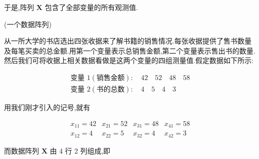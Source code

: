 于是,阵列 $\bm{X}$ 包含了全部变量的所有观测值.

 (一个数据阵列)

从一所大学的书店选出四张收据来了解书籍的销售情况.每张收据提供了售书数量及每笔买卖的总金额.用第一个变量表示总销售金额,第二个变量表示售出书的数量.然后我们可将收据上相关数据看做是这两个变量的四组测量值.假定数据如下所示:

\[
\begin{array}{l}
\text{变量 }1(\text{销售金额}):\quad 42 \quad 52 \quad 48 \quad 58 \\[2pt]
\text{变量 }2(\text{书的总数}):\quad 4 \quad 5 \quad 4 \quad 3
\end{array}
\]

用我们刚才引入的记号,就有

\[
\begin{array}{llll}
x_{11} = 42 & x_{21} = 52 & x_{31} = 48 & x_{41} = 58 \\[2pt]
x_{12} = 4 & x_{22} = 5 & x_{32} = 4 & x_{42} = 3
\end{array}
\]

而数据阵列 $\bm{X}$ 由 4 行 2 列组成,即
